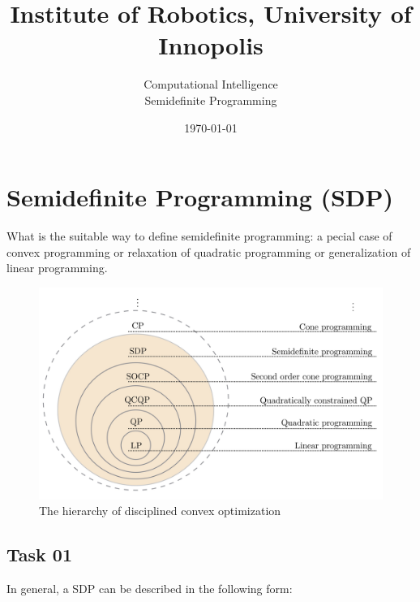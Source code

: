 \documentclass[12pt]{article}%
\begin{document}
\title{Institute of Robotics,  University of Innopolis}
\author{Computational Intelligence \\ Semidefinite Programming}
\date{\today}
\maketitle

\section{Semidefinite Programming (SDP)}
What is the suitable way to define semidefinite programming: a pecial case of convex programming or relaxation of quadratic programming or generalization of linear programming. 

\begin{figure}[H]
    \begin{center}
    \includegraphics[width=12cm]{classification.jpeg}
    \caption{The hierarchy of disciplined convex optimization~\cite{classification}}\label{f:classification}
    \end{center}
\end{figure}

\subsection{Task 01}

In general, a SDP can be described in the following form: 
\end{document}
